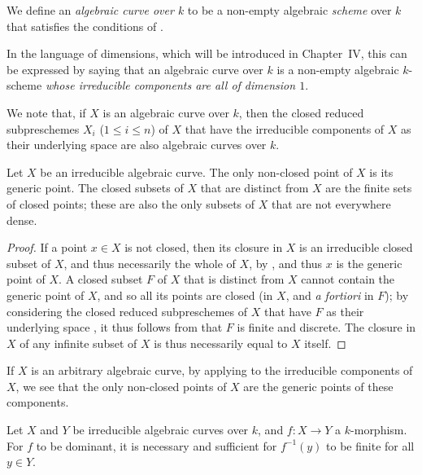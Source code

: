 \begin{definition}[7.4.2]
\label{II.7.4.2}
We define an \emph{algebraic curve over $k$} to be a non-empty algebraic \emph{scheme} over $k$ that satisfies the conditions of .
\end{definition}

In the language of dimensions, which will be introduced in Chapter~IV, this can be expressed by saying that an algebraic curve over $k$ is a non-empty algebraic $k$-scheme \emph{whose irreducible components are all of dimension $1$}.

We note that, if $X$ is an algebraic curve over $k$, then the closed reduced subpreschemes $X_i$ ($1\leq i\leq n$) of $X$ that have the irreducible components of $X$ as their underlying space are also algebraic curves over $k$.

\begin{corollary}[7.4.3]
\label{II.7.4.3}
Let $X$ be an irreducible algebraic curve.
The only non-closed point of $X$ is its generic point.
The closed subsets of $X$ that are distinct from $X$ are the finite sets of closed points;
these are also the only subsets of $X$ that are not everywhere dense.
\end{corollary}

\begin{proof}
If a point $x\in X$ is not closed, then its closure in $X$ is an irreducible closed subset of $X$, and thus necessarily the whole of $X$, by , and thus $x$ is the generic point of $X$.
A closed subset $F$ of $X$ that is distinct from $X$ cannot contain
the generic point of $X$, and so all its points are closed (in $X$, and \emph{a fortiori} in $F$);
by considering the closed reduced subpreschemes of $X$ that have $F$ as their underlying space , it thus follows from  that $F$ is finite and discrete.
The closure in $X$ of any infinite subset of $X$ is thus necessarily equal to $X$ itself.
\end{proof}

If $X$ is an arbitrary algebraic curve, by applying  to the irreducible components of $X$, we see that the only non-closed points of $X$ are the generic points of these components.

\begin{corollary}[7.4.4]
\label{II.7.4.4}
Let $X$ and $Y$ be irreducible algebraic curves over $k$, and $f:X\to Y$ a $k$-morphism.
For $f$ to be dominant, it is necessary and sufficient for $f^{-1}(y)$ to be finite for all $y\in Y$.
\end{corollary}


